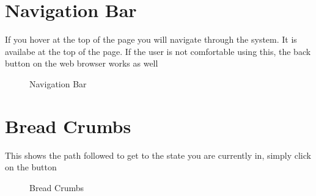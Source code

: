 \documentclass[12pt]{article}
\begin{document}
 \newpage

\section{Navigation Bar}
If you hover at the top of the page you will navigate through the system. It is availabe at the top of the page. If the user is not comfortable using this, the back button on the web browser works as well
\begin{figure}[H]
\centering	
{}
\caption{Navigation Bar}
\end{figure}

 \newpage

\section{Bread Crumbs}
This shows the path followed to get to the state you are currently in, simply click on the button
\begin{figure}[H]
\centering	
{}
\caption{Bread Crumbs}
\end{figure}
\end{document}
